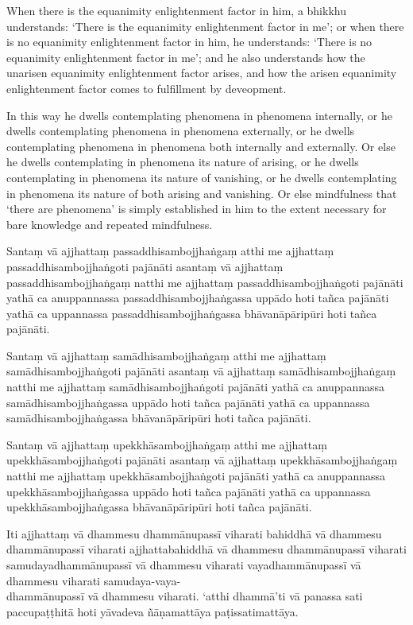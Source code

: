 When there is the equanimity enlightenment factor in him, a bhikkhu understands:
`There is the equanimity enlightenment factor in me'; or when there is no
equanimity enlightenment factor in him, he understands: `There is no equanimity
enlightenment factor in me'; and he also understands how the unarisen equanimity
enlightenment factor arises, and how the arisen equanimity enlightenment factor
comes to fulfillment by deveopment.

In this way he dwells contemplating phenomena in phenomena internally, or he
dwells contemplating phenomena in phenomena externally, or he dwells
contemplating phenomena in phenomena both internally and externally. Or else he
dwells contemplating in phenomena its nature of arising, or he dwells
contemplating in phenomena its nature of vanishing, or he dwells contemplating
in phenomena its nature of both arising and vanishing. Or else mindfulness that
‘there are phenomena’ is simply established in him to the extent necessary for
bare knowledge and repeated mindfulness.

\paliPage

Santaṃ vā ajjhattaṃ passaddhisambojjhaṅgaṃ atthi me ajjhattaṃ
passaddhisambojjhaṅgoti pajānāti asantaṃ vā ajjhattaṃ passaddhisambojjhaṅgaṃ
natthi me ajjhattaṃ passaddhisambojjhaṅgoti pajānāti yathā ca anuppannassa
passaddhisambojjhaṅgassa uppādo hoti tañca pajānāti yathā ca uppannassa
passaddhisambojjhaṅgassa bhāvanāpāripūri hoti tañca pajānāti.

Santaṃ vā ajjhattaṃ samādhisambojjhaṅgaṃ atthi me ajjhattaṃ
samādhisambojjhaṅgoti pajānāti asantaṃ vā ajjhattaṃ samādhisambojjhaṅgaṃ natthi
me ajjhattaṃ samādhisambojjhaṅgoti pajānāti yathā ca anuppannassa
samādhisambojjhaṅgassa uppādo hoti tañca pajānāti yathā ca uppannassa
samādhisambojjhaṅgassa bhāvanāpāripūri hoti tañca pajānāti.

Santaṃ vā ajjhattaṃ upekkhāsambojjhaṅgaṃ atthi me ajjhattaṃ
upekkhāsambojjhaṅgoti pajānāti asantaṃ vā ajjhattaṃ upekkhāsambojjhaṅgaṃ natthi
me ajjhattaṃ upekkhāsambojjhaṅgoti pajānāti yathā ca anuppannassa
upekkhāsambojjhaṅgassa uppādo hoti tañca pajānāti yathā ca uppannassa
upekkhāsambojjhaṅgassa bhāvanāpāripūri hoti tañca pajānāti.

Iti ajjhattaṃ vā dhammesu dhammānupassī viharati bahiddhā vā dhammesu
dhammānupassī viharati ajjhattabahiddhā vā dhammesu dhammānupassī viharati
samudayadhammānupassī vā dhammesu viharati vayadhammānupassī vā dhammesu
viharati samudaya-vaya-\\
dhammānupassī vā dhammesu viharati. `atthi dhammā'ti vā
panassa sati paccupaṭṭhitā hoti yāvadeva ñāṇamattāya paṭissatimattāya.

